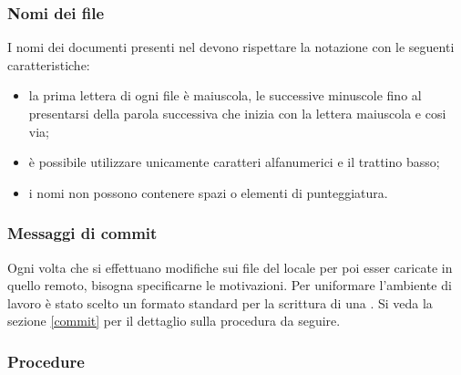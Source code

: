         \subsubsection{Nomi dei file}
        I nomi dei documenti presenti nel  devono rispettare la notazione  con le seguenti caratteristiche:
        \begin{itemize}
        	\item la prima lettera di ogni file è maiuscola, le successive minuscole fino al presentarsi della parola successiva che inizia con la lettera maiuscola e cosi via;
        	\item è possibile utilizzare unicamente caratteri alfanumerici e il trattino basso;
        	\item i nomi non possono contenere spazi o elementi di punteggiatura.
        \end{itemize}
        \subsubsection{Messaggi di commit}
		Ogni volta che si effettuano modifiche sui file del  locale per poi esser caricate in quello remoto, bisogna specificarne le motivazioni. Per uniformare l'ambiente di lavoro è stato scelto un formato standard per la scrittura di una . Si veda la sezione \ref{commit} per il dettaglio sulla procedura da seguire.
        \subsubsection{Procedure}
